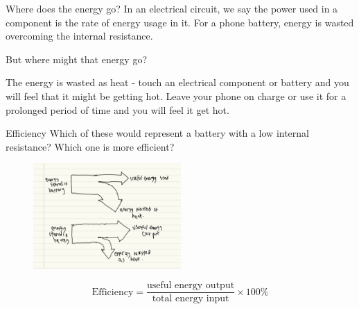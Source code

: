 \documentclass[../Main.tex]{subfiles}
\begin{document}
\begin{frame}{Where does the energy go?}
    In an electrical circuit, we say the power used in a component is the rate of energy usage in it. For a phone battery, energy is wasted overcoming the internal resistance. \newline \newline
    
    But where might that energy go? 
    
    \pause
    
    The energy is wasted as heat - touch an electrical component or battery and you will feel that it might be getting hot. Leave your phone on charge or use it for a prolonged period of time and you will feel it get hot.
\end{frame}

\begin{frame}{Efficiency}
    Which of these would represent a battery with a low internal resistance? Which one is more efficient?
    \begin{figure}
        \centering
        \includegraphics[height=4cm]{Electricity_Images/sankey_diagram.png}
    \end{figure}
    \pause
    \begin{equation*}
        \text{Efficiency} = \frac{\text{useful energy output}}{\text{total energy input}} \times 100\%
    \end{equation*}
\end{frame}
\end{document}
